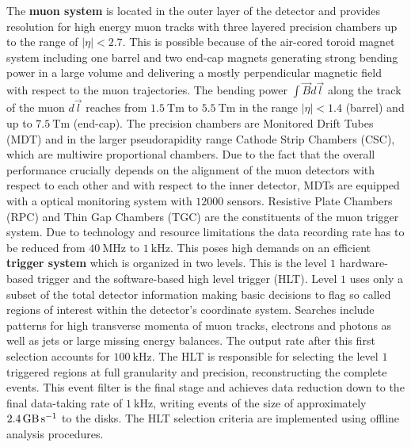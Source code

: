 The \textbf{muon system} is located in the outer layer of the {\ATLAS} detector and provides resolution for high energy muon tracks with three layered precision chambers up to the range of $|\eta|<2.7$. This is possible because of the air-cored toroid magnet system including one barrel and two end-cap magnets generating strong bending power in a large volume and delivering  a mostly perpendicular magnetic field with respect to the muon trajectories. The bending power $\int{\vec{B}d\vec{l}}$ along the track of the muon $d\vec{l}$ reaches from $\SI{1.5}{\tesla\meter}$ to $\SI{5.5}{\tesla\meter}$ in the range $|\eta|<1.4$ (barrel) and up to $\SI{7.5}{\tesla\meter}$ (end-cap). The precision chambers are Monitored Drift Tubes (MDT) and in the larger pseudorapidity range Cathode Strip Chambers (CSC), which are multiwire proportional chambers. Due to the fact that the overall performance crucially depends on the alignment of the muon detectors with respect to each other and with respect to the inner detector, MDTs are equipped with a optical monitoring system with $12000$ sensors. Resistive Plate Chambers (RPC) and Thin Gap Chambers (TGC) are the constituents of the muon trigger system. \cite{ATLASJINST} \newline %
Due to technology and resource limitations the data recording rate has to be reduced from $\SI{40}{\mega\hertz}$ to $\SI{1}{\kilo\hertz}$. This poses high demands on an efficient \textbf{trigger system} which is organized in two levels. This is the level $1$ hardware-based trigger and the software-based high level trigger (HLT). Level $1$ uses only a subset of the total detector information making basic decisions to flag so called regions of interest within the detector's coordinate system. Searches include patterns for high transverse momenta of muon tracks, electrons and photons as well as jets or large missing energy balances. The output rate after this first selection accounts for $\SI{100}{\kilo\hertz}$. The HLT is responsible for selecting the level $1$ triggered regions at full granularity and precision, reconstructing the complete events. This event filter is the final stage and achieves data reduction down to the final data-taking rate of $\SI{1}{\kilo\hertz}$, writing events of the size of approximately $\SI{2.4}{\giga\byte\per\second}$ to the disks. The HLT selection criteria are implemented using offline analysis procedures. \cite{ATLASJINST}\cite{newATLASJINST} %
